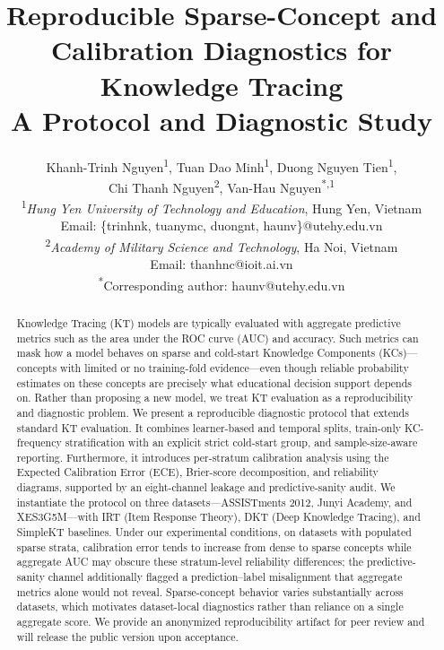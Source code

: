 \documentclass[12pt,a4paper]{jedm}
\begin{document}
\title{\sffamily\bfseries Reproducible Sparse-Concept and Calibration Diagnostics for Knowledge Tracing\\
{\large A Protocol and Diagnostic Study}}

\author{
\sffamily Khanh-Trinh Nguyen\textsuperscript{1}, Tuan Dao Minh\textsuperscript{1}, Duong Nguyen Tien\textsuperscript{1}, \\
\sffamily Chi Thanh Nguyen\textsuperscript{2}, Van-Hau Nguyen\textsuperscript{*,1}\\[8pt]
\normalsize \textsuperscript{1}\textit{Hung Yen University of Technology and Education}, Hung Yen, Vietnam\\
\normalsize Email: \{trinhnk, tuanymc, duongnt, haunv\}@utehy.edu.vn\\[4pt]
\normalsize \textsuperscript{2}\textit{Academy of Military Science and Technology}, Ha Noi, Vietnam\\
\normalsize Email: thanhnc@ioit.ai.vn\\[8pt]
\normalsize \textsuperscript{*}Corresponding author: haunv@utehy.edu.vn
}
\date{}

\maketitle

\begin{abstract}
Knowledge Tracing (KT) models are typically evaluated with aggregate predictive metrics such as the area under the ROC curve (AUC) and accuracy. Such metrics can mask how a model behaves on sparse and cold-start Knowledge Components (KCs)---concepts with limited or no training-fold evidence---even though reliable probability estimates on these concepts are precisely what educational decision support depends on. Rather than proposing a new model, we treat KT evaluation as a reproducibility and diagnostic problem. We present a reproducible diagnostic protocol that extends standard KT evaluation. It combines learner-based and temporal splits, train-only KC-frequency stratification with an explicit strict cold-start group, and sample-size-aware reporting. Furthermore, it introduces per-stratum calibration analysis using the Expected Calibration Error (ECE), Brier-score decomposition, and reliability diagrams, supported by an eight-channel leakage and predictive-sanity audit. We instantiate the protocol on three datasets---ASSISTments 2012, Junyi Academy, and XES3G5M---with IRT (Item Response Theory), DKT (Deep Knowledge Tracing), and SimpleKT baselines. Under our experimental conditions, on datasets with populated sparse strata, calibration error tends to increase from dense to sparse concepts while aggregate AUC may obscure these stratum-level reliability differences; the predictive-sanity channel additionally flagged a prediction--label misalignment that aggregate metrics alone would not reveal. Sparse-concept behavior varies substantially across datasets, which motivates dataset-local diagnostics rather than reliance on a single aggregate score. We provide an anonymized reproducibility artifact for peer review and will release the public version upon acceptance.
\end{abstract}
\end{document}
